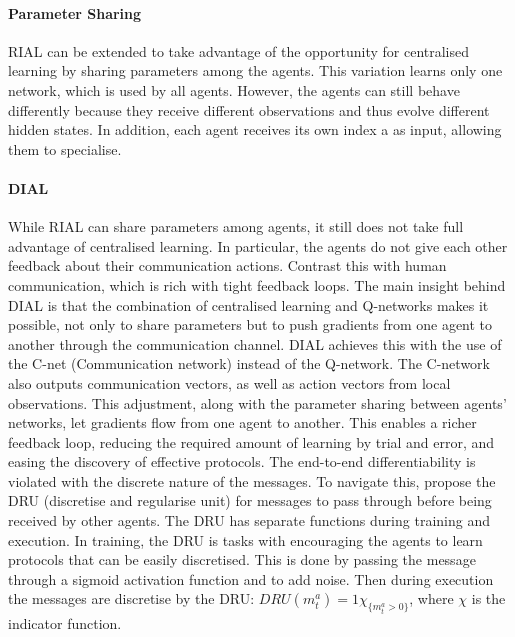 \documentclass{article}
\begin{document}
\paragraph{Parameter Sharing} RIAL can be extended to take advantage of the opportunity for centralised learning by sharing parameters among the agents. This variation learns only one network, which is used by all agents. However, the agents can still behave differently because they receive different observations and thus evolve different hidden states. In addition, each agent receives its own index a as input, allowing them to specialise.

\paragraph{DIAL} While RIAL can share parameters among agents, it still does not take full advantage of centralised learning. In particular, the agents do not give each other feedback about their communication actions. Contrast this with human communication, which is rich with tight feedback loops. The main insight behind DIAL is that the combination of centralised learning and Q-networks makes it possible, not only to share parameters but to push gradients from one agent to another through the communication channel. DIAL achieves this with the use of the C-net (Communication network) instead of the Q-network. The C-network also outputs communication vectors, as well as action vectors from local observations. This adjustment, along with the parameter sharing between agents' networks, let gradients flow from one agent to another. This enables a richer feedback loop, reducing the required amount of learning by trial and error, and easing the discovery of effective protocols. The end-to-end differentiability is violated with the discrete nature of the messages. To navigate this, \citet{foerster2016learning} propose the DRU (discretise and regularise unit) for messages to pass through before being received by other agents. The DRU has separate functions during training and execution. In training, the DRU is tasks with encouraging the agents to learn protocols that can be easily discretised. This is done by passing the message through a sigmoid activation function and to add noise. Then during execution the messages are discretise by the DRU: $DRU(m_t^a) = 1\chi_{\{ m_t^a > 0 \}}$, where $\chi$ is the indicator function.

\
\end{document}
